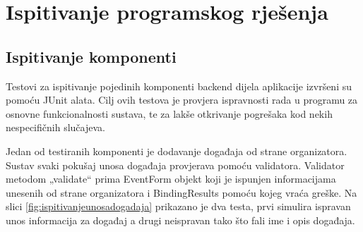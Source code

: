 \eject 


\section{Ispitivanje programskog rješenja}


\subsection{Ispitivanje komponenti}

\bigskip

\normalfont Testovi za ispitivanje pojedinih komponenti backend dijela aplikacije izvršeni su pomoću JUnit alata. Cilj ovih testova je provjera ispravnosti rada u programu za osnovne funkcionalnosti sustava, te za lakše otkrivanje pogrešaka kod nekih nespecifičnih slučajeva. 

\normalcolor\noindent Jedan od testiranih komponenti je dodavanje događaja od strane organizatora. Sustav svaki pokušaj unosa događaja provjerava pomoću validatora. Validator metodom „validate“ prima EventForm objekt koji je ispunjen informacijama unesenih od strane organizatora i BindingResults pomoću kojeg vraća greške. Na slici \ref{fig:ispitivanjeunosadogadaja} prikazano je dva testa, prvi simulira ispravan unos informacija za događaj a drugi neispravan tako što fali ime i opis događaja.


